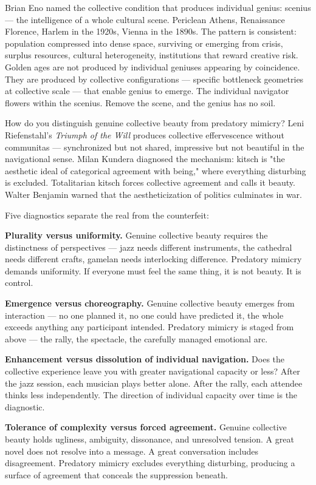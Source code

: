 Brian Eno named the collective condition that produces individual genius: scenius — the intelligence of a whole cultural scene. Periclean Athens, Renaissance Florence, Harlem in the 1920s, Vienna in the 1890s. The pattern is consistent: population compressed into dense space, surviving or emerging from crisis, surplus resources, cultural heterogeneity, institutions that reward creative risk. Golden ages are not produced by individual geniuses appearing by coincidence. They are produced by collective configurations — specific bottleneck geometries at collective scale — that enable genius to emerge. The individual navigator flowers within the scenius. Remove the scene, and the genius has no soil.


How do you distinguish genuine collective beauty from predatory mimicry? Leni Riefenstahl's \textit{Triumph of the Will} produces collective effervescence without communitas — synchronized but not shared, impressive but not beautiful in the navigational sense. Milan Kundera diagnosed the mechanism: kitsch is "the aesthetic ideal of categorical agreement with being," where everything disturbing is excluded. Totalitarian kitsch forces collective agreement and calls it beauty. Walter Benjamin warned that the aestheticization of politics culminates in war.


Five diagnostics separate the real from the counterfeit:


\textbf{Plurality versus uniformity.} Genuine collective beauty requires the distinctness of perspectives — jazz needs different instruments, the cathedral needs different crafts, gamelan needs interlocking difference. Predatory mimicry demands uniformity. If everyone must feel the same thing, it is not beauty. It is control.


\textbf{Emergence versus choreography.} Genuine collective beauty emerges from interaction — no one planned it, no one could have predicted it, the whole exceeds anything any participant intended. Predatory mimicry is staged from above — the rally, the spectacle, the carefully managed emotional arc.


\textbf{Enhancement versus dissolution of individual navigation.} Does the collective experience leave you with greater navigational capacity or less? After the jazz session, each musician plays better alone. After the rally, each attendee thinks less independently. The direction of individual capacity over time is the diagnostic.


\textbf{Tolerance of complexity versus forced agreement.} Genuine collective beauty holds ugliness, ambiguity, dissonance, and unresolved tension. A great novel does not resolve into a message. A great conversation includes disagreement. Predatory mimicry excludes everything disturbing, producing a surface of agreement that conceals the suppression beneath.


